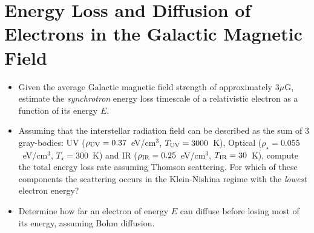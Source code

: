 \section{Energy Loss and Diffusion of Electrons in the Galactic Magnetic Field}

\begin{itemize}
\item Given the average Galactic magnetic field strength of approximately \( 3 \mu\)G, estimate the \emph{synchrotron} energy loss timescale of a relativistic electron as a function of its energy $E$.

\item Assuming that the interstellar radiation field can be described as the sum of 3 gray-bodies: UV ($\rho_{\rm UV} = 0.37$~eV/cm$^3$, $T_{\rm UV} = 3000$~K), Optical ($\rho_{\star} = 0.055$~eV/cm$^3$, $T_{\star} = 300$~K) and IR ($\rho_{\rm IR} = 0.25$~eV/cm$^3$, $T_{\rm IR} = 30$~K), compute the total energy loss rate assuming Thomson scattering. For which of these components the scattering occurs in the Klein-Nishina regime with the \emph{lowest} electron energy?

\item Determine how far an electron of energy $E$ can diffuse before losing most of its energy, assuming Bohm diffusion.
\end{itemize}
